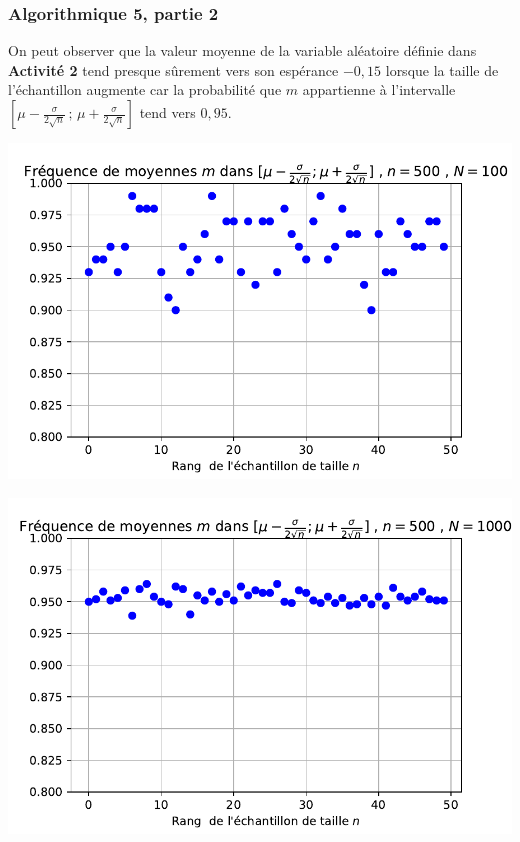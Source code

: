 \documentclass[11pt, hyperref={urlcolor=red,%
            linkcolor=blue, %
            colorlinks=true}]{beamer}
\newcommand{\Interff}[2]{\left[#1\, ;\, #2\right]}
\begin{document}
\begin{frame}[fragile]
\frametitle{Algorithmique 5,  partie 2}



On peut observer que la valeur moyenne de la variable aléatoire définie dans \textbf{Activité 2} tend presque sûrement vers son espérance  $-0,15$ lorsque la taille de l'échantillon augmente car la probabilité que $m$ appartienne à l'intervalle $\Interff{\mu - \frac{\sigma}{2 \sqrt{n}}}{\mu + \frac{\sigma}{2 \sqrt{n}}}$ tend vers $0,95$.


\begin{minipage}{0.45\linewidth}
\begin{center}

\includegraphics[scale=0.3]{images/frequence-fluctuation-activ2-N-100.pdf}
\end{center}
\end{minipage}
\hfill
\begin{minipage}{0.45\linewidth}
\begin{center}

\includegraphics[scale=0.3]{images/frequence-fluctuation-activ2-N-1000.pdf}
\end{center}
\end{minipage}


\end{frame}
\end{document}
